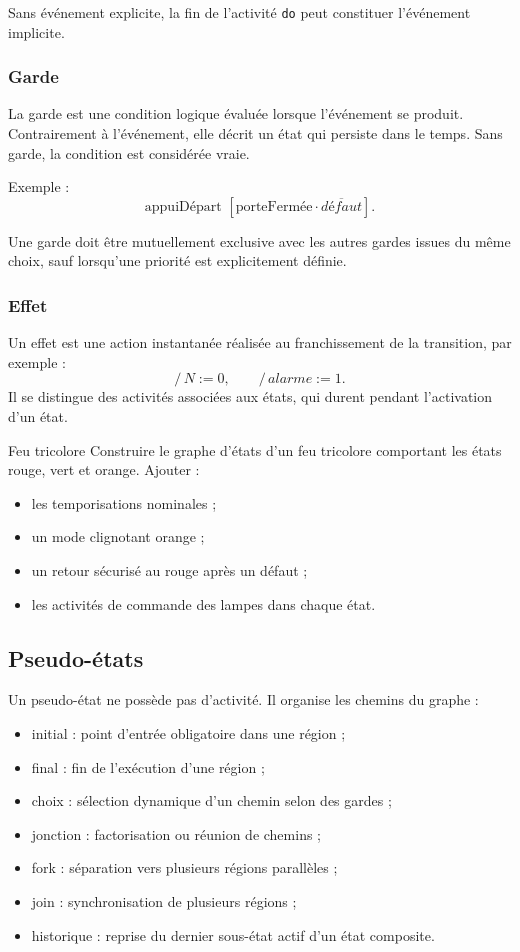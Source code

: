 Sans événement explicite, la fin de l'activité \texttt{do} peut constituer l'événement implicite.

\subsubsection{Garde}

La garde est une condition logique évaluée lorsque l'événement se produit. Contrairement à l'événement, elle décrit un état qui persiste dans le temps. Sans garde, la condition est considérée vraie.

Exemple :
\[
\text{appuiDépart }[\text{porteFermée}\cdot\overline{défaut}].
\]

Une garde doit être mutuellement exclusive avec les autres gardes issues du même choix, sauf lorsqu'une priorité est explicitement définie.

\subsubsection{Effet}

Un effet est une action instantanée réalisée au franchissement de la transition, par exemple :
\[
/\,N:=0,
\qquad
/\,alarme:=1.
\]
Il se distingue des activités associées aux états, qui durent pendant l'activation d'un état.

\begin{TLLogicApplication}{Feu tricolore}
Construire le graphe d'états d'un feu tricolore comportant les états rouge, vert et orange. Ajouter :
\begin{itemize}
  \item les temporisations nominales ;
  \item un mode clignotant orange ;
  \item un retour sécurisé au rouge après un défaut ;
  \item les activités de commande des lampes dans chaque état.
\end{itemize}
\end{TLLogicApplication}

\subsection{Pseudo-états}

Un pseudo-état ne possède pas d'activité. Il organise les chemins du graphe :
\begin{itemize}
  \item initial : point d'entrée obligatoire dans une région ;
  \item final : fin de l'exécution d'une région ;
  \item choix : sélection dynamique d'un chemin selon des gardes ;
  \item jonction : factorisation ou réunion de chemins ;
  \item fork : séparation vers plusieurs régions parallèles ;
  \item join : synchronisation de plusieurs régions ;
  \item historique : reprise du dernier sous-état actif d'un état composite.
\end{itemize}

